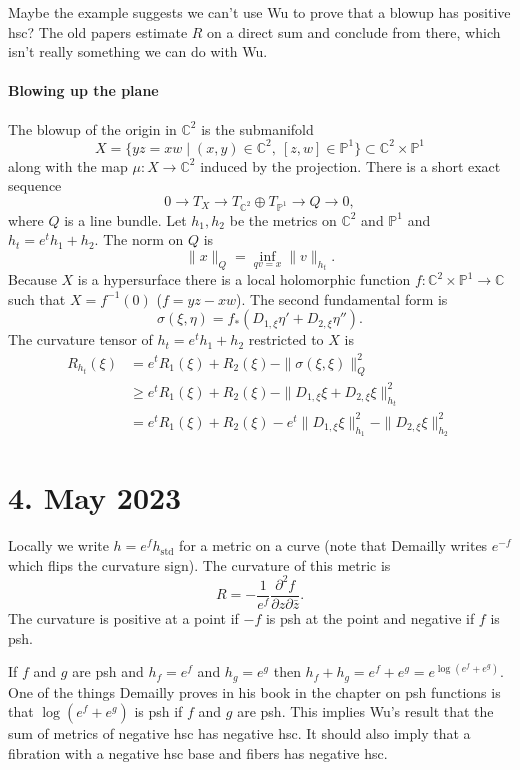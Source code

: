 \documentclass[11pt]{article}
\theoremstyle{definition}
\newcommand{\kk}[1]{\mathbb{#1}}
\begin{document}
Maybe the example suggests we can't use
Wu to prove that a blowup has positive hsc?
The old papers estimate $R$ on a direct sum and conclude from there, which
isn't really something we can do with Wu.


\paragraph{Blowing up the plane}

The blowup of the origin in $\kk C^2$ is the submanifold
$$
X
= \{ y z = x w \mid (x, y) \in \kk C^2, \ [z,w] \in \kk P^1 \}
\subset \kk C^2 \times \kk P^1
$$
along with the map $\mu : X \to \kk C^2$ induced by the projection.
There is a short exact sequence
$$
0 \to T_X \to T_{\kk C^2} \oplus T_{\kk P^1} \to Q \to 0,
$$
where $Q$ is a line bundle.
Let $h_1, h_2$ be the metrics on $\kk C^2$ and $\kk P^1$ and $h_t = e^t h_1 + h_2$.
The norm on $Q$ is
$$
\|x\|_Q = \inf_{q v = x} \| v \|_{h_t}.
$$
Because $X$ is a hypersurface there is a local holomorphic function $f : \kk
C^2 \times \kk P^1 \to \kk C$ such that $X = f^{-1}(0)$ ($f = yz - xw$).
The second fundamental form is
$$
\sigma(\xi, \eta)
= f_*(D_{1,\xi} \eta' + D_{2,\xi} \eta'').
$$
The curvature tensor of $h_t = e^t h_1 + h_2$ restricted to $X$ is
\begin{align*}
R_{h_t}(\xi)
&= e^t R_1(\xi) + R_2(\xi) - \|\sigma(\xi, \xi)\|_Q^2
\\
&\geq e^t R_1(\xi) + R_2(\xi) - \|D_{1,\xi}\xi + D_{2,\xi} \xi\|_{h_t}^2
\\
&= e^t R_1(\xi) + R_2(\xi) -
e^t \|D_{1,\xi}\xi\|_{h_1}^2 - \| D_{2,\xi} \xi\|_{h_2}^2
\end{align*}


\section{4. May 2023}

Locally we write $h = e^f h_{\text{std}}$ for a metric on a curve (note that
Demailly writes $e^{-f}$ which flips the curvature sign).
The curvature of this metric is
$$
R = -\frac{1}{e^f} \frac{\partial^2 f}{\partial z \partial \bar z}.
$$
The curvature is positive at a point if $-f$ is psh at the point and negative
if $f$ is psh.

If $f$ and $g$ are psh and $h_f = e^f$ and $h_g = e^g$ then $h_f + h_g = e^f +
e^g = e^{\log(e^f + e^g)}$.
One of the things Demailly proves in his book in the chapter on psh functions
is that $\log(e^f + e^g)$ is psh if $f$ and $g$ are psh.
This implies Wu's result that the sum of metrics of negative hsc has negative hsc.
It should also imply that a fibration with a negative hsc base and fibers has
negative hsc.
\end{document}
